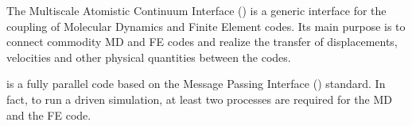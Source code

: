 
The Multiscale Atomistic Continuum Interface (\MACI) is a generic \CPP 
interface for the coupling of Molecular Dynamics and Finite Element codes.
Its main purpose is to connect commodity MD and FE codes and realize
the transfer of displacements, velocities and other physical quantities
between the codes.

\MACI is a fully parallel code based on the Message Passing Interface (\MPI) 
standard. In fact, to run a \MACI driven simulation, at least two \MPI 
processes are required for the MD and the FE code. 

